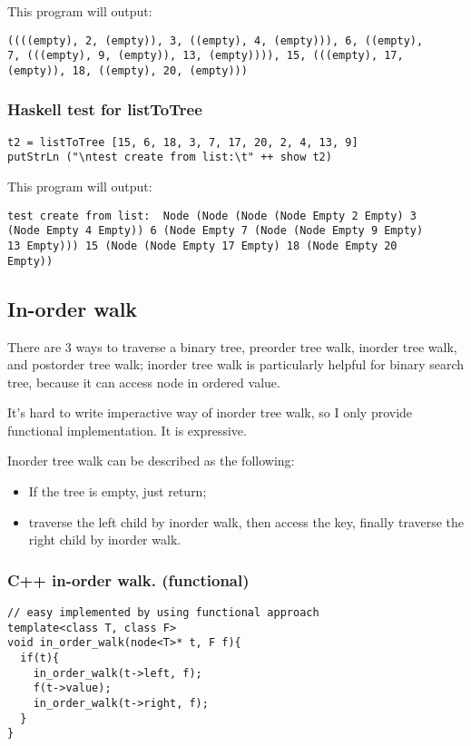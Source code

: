 \documentclass{article}
\begin{document}
This program will output:
\begin{verbatim}
((((empty), 2, (empty)), 3, ((empty), 4, (empty))), 6, ((empty), 
7, (((empty), 9, (empty)), 13, (empty)))), 15, (((empty), 17, 
(empty)), 18, ((empty), 20, (empty)))
\end{verbatim}

\subsubsection*{Haskell test for listToTree}
\lstset{language=Haskell}
\begin{lstlisting}
t2 = listToTree [15, 6, 18, 3, 7, 17, 20, 2, 4, 13, 9]
putStrLn ("\ntest create from list:\t" ++ show t2)
\end{lstlisting}

This program will output:
\begin{verbatim}
test create from list:  Node (Node (Node (Node Empty 2 Empty) 3 
(Node Empty 4 Empty)) 6 (Node Empty 7 (Node (Node Empty 9 Empty) 
13 Empty))) 15 (Node (Node Empty 17 Empty) 18 (Node Empty 20 
Empty))
\end{verbatim}


\subsection{In-order walk}

There are 3 ways to traverse a binary tree, preorder tree walk, inorder 
tree walk, and postorder tree walk; inorder tree walk is particularly helpful
for binary search tree, because it can access node in ordered value.

It's hard to write imperactive way of inorder tree walk, so I only provide
functional implementation. It is expressive.

Inorder tree walk can be described as the following:
\begin{itemize}
\item If the tree is empty, just return;
\item traverse the left child by inorder walk, then access the key, 
finally traverse the right child by inorder walk.
\end{itemize}

\subsubsection*{C++ in-order walk. (functional)}
\lstset{language=C++}
\begin{lstlisting}
// easy implemented by using functional approach
template<class T, class F>
void in_order_walk(node<T>* t, F f){
  if(t){
    in_order_walk(t->left, f);
    f(t->value);
    in_order_walk(t->right, f);
  }
}
\end{lstlisting}
\end{document}
